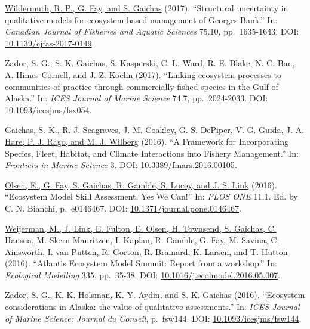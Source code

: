 \documentclass[11pt, a4paper]{awesome-cv}
\begin{document}
\protect\hyperlink{cite-wildermuth_structural_2017}{Wildermuth, R. P.,
G. Fay, and S. Gaichas} (2017). ``Structural uncertainty in qualitative
models for ecosystem-based management of Georges Bank.'' In:
\emph{Canadian Journal of Fisheries and Aquatic Sciences} 75.10,
pp.~1635-1643. DOI:
\href{https://doi.org/10.1139\%2Fcjfas-2017-0149}{10.1139/cjfas-2017-0149}.

\protect\hyperlink{cite-zador_linking_2017}{Zador, S. G., S. K. Gaichas,
S. Kasperski, C. L. Ward, R. E. Blake, N. C. Ban, A. Himes-Cornell, and
J. Z. Koehn} (2017). ``Linking ecosystem processes to communities of
practice through commercially fished species in the Gulf of Alaska.''
In: \emph{ICES Journal of Marine Science} 74.7, pp.~2024-2033. DOI:
\href{https://doi.org/10.1093\%2Ficesjms\%2Ffsx054}{10.1093/icesjms/fsx054}.

\protect\hyperlink{cite-gaichas_framework_2016}{Gaichas, S. K., R. J.
Seagraves, J. M. Coakley, G. S. DePiper, V. G. Guida, J. A. Hare, P. J.
Rago, and M. J. Wilberg} (2016). ``A Framework for Incorporating
Species, Fleet, Habitat, and Climate Interactions into Fishery
Management.'' In: \emph{Frontiers in Marine Science} 3. DOI:
\href{https://doi.org/10.3389\%2Ffmars.2016.00105}{10.3389/fmars.2016.00105}.

\protect\hyperlink{cite-olsen_ecosystem_2016}{Olsen, E., G. Fay, S.
Gaichas, R. Gamble, S. Lucey, and J. S. Link} (2016). ``Ecosystem Model
Skill Assessment. Yes We Can!'' In: \emph{PLOS ONE} 11.1. Ed. by C. N.
Bianchi, p.~e0146467. DOI:
\href{https://doi.org/10.1371\%2Fjournal.pone.0146467}{10.1371/journal.pone.0146467}.

\protect\hyperlink{cite-weijerman_atlantis_2016}{Weijerman, M., J. Link,
E. Fulton, E. Olsen, H. Townsend, S. Gaichas, C. Hansen, M.
Skern-Mauritzen, I. Kaplan, R. Gamble, G. Fay, M. Savina, C. Ainsworth,
I. van Putten, R. Gorton, R. Brainard, K. Larsen, and T. Hutton} (2016).
``Atlantis Ecosystem Model Summit: Report from a workshop.'' In:
\emph{Ecological Modelling} 335, pp.~35-38. DOI:
\href{https://doi.org/10.1016\%2Fj.ecolmodel.2016.05.007}{10.1016/j.ecolmodel.2016.05.007}.

\protect\hyperlink{cite-zador_ecosystem_2016}{Zador, S. G., K. K.
Holsman, K. Y. Aydin, and S. K. Gaichas} (2016). ``Ecosystem
considerations in Alaska: the value of qualitative assessments.'' In:
\emph{ICES Journal of Marine Science: Journal du Conseil}, p.~fsw144.
DOI:
\href{https://doi.org/10.1093\%2Ficesjms\%2Ffsw144}{10.1093/icesjms/fsw144}.
\end{document}
